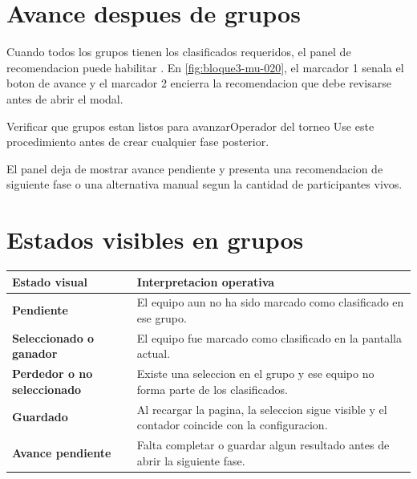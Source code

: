 \section{Avance despues de grupos}


Cuando todos los grupos tienen los clasificados requeridos, el panel de recomendacion puede habilitar . En \cref{fig:bloque3-mu-020}, el marcador 1 senala el boton de avance y el marcador 2 encierra la recomendacion que debe revisarse antes de abrir el modal.

\begin{procedimiento}{Verificar que grupos estan listos para avanzar}{Operador del torneo}
Use este procedimiento antes de crear cualquier fase posterior.
\end{procedimiento}


\begin{resultadoesperado}
El panel deja de mostrar avance pendiente y presenta una recomendacion de siguiente fase o una alternativa manual segun la cantidad de participantes vivos.
\end{resultadoesperado}

\section{Estados visibles en grupos}

\begin{tabularx}{\linewidth}{>{\bfseries}p{3.8cm}X}
\toprule
Estado visual & Interpretacion operativa\\
\midrule
Pendiente & El equipo aun no ha sido marcado como clasificado en ese grupo.\\
Seleccionado o ganador & El equipo fue marcado como clasificado en la pantalla actual.\\
Perdedor o no seleccionado & Existe una seleccion en el grupo y ese equipo no forma parte de los clasificados.\\
Guardado & Al recargar la pagina, la seleccion sigue visible y el contador coincide con la configuracion.\\
Avance pendiente & Falta completar o guardar algun resultado antes de abrir la siguiente fase.\\
\bottomrule
\end{tabularx}

